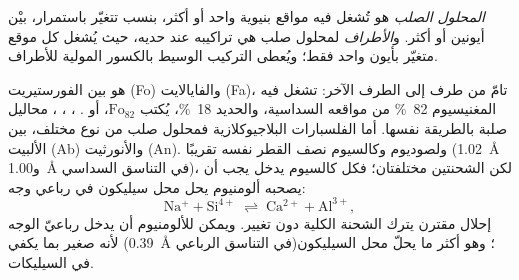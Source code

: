 \begin{definition}\label{def:b1:rock-forming-minerals:solid-solution}
\emph{المحلول الصلب} هو  تُشغل فيه مواقع بنيوية واحد أو أكثر، بنسب تتغيّر باستمرار، بيْن أيونين أو أكثر. و\emph{الأطراف} لمحلول صلب هي تراكيبه عند حديه، حيث يُشغل كل موقع متغيّر بأيون واحد فقط؛ ويُعطى التركيب الوسيط بالكسور المولية للأطراف.
\end{definition}

 هو  بين الفورستيريت  (Fo) والفايالايت  (Fa)، تامّ من طرف إلى الطرف الآخر:  تشغل فيه المغنيسيوم \qty{82}{\percent} من مواقعه السداسية، والحديد \qty{18}{\percent}، يُكتب $\text{Fo}_{82}$، أو . ، ، ،  محاليل صلبة بالطريقة نفسها. أما الفلسبارات البلاجيوكلازية فمحلول صلب من نوع مختلف، بين الألبيت  (Ab) والأنورثيت  (An). ولصوديوم وكالسيوم نصف القطر نفسه تقريبًا (\qty{1.02}{\angstrom} و\qty{1.00}{\angstrom} في التناسق السداسي)، لكن الشحنتين مختلفتان؛ فكل كالسيوم يدخل يجب أن يصحبه ألومنيوم يحل محل سيليكون في رباعي وجه:
\[
  \mathrm{Na^{+}} + \mathrm{Si^{4+}} \;\rightleftharpoons\; \mathrm{Ca^{2+}} + \mathrm{Al^{3+}},
\]
إحلال مقترن يترك الشحنة الكلية دون تغيير.
ويمكن للألومنيوم أن يدخل رباعيّ الوجه لأنه صغير بما يكفي (\qty{0.39}{\angstrom} في التناسق الرباعي)؛ وهو أكثر ما يحلّ محل السيليكون في السيليكات.

